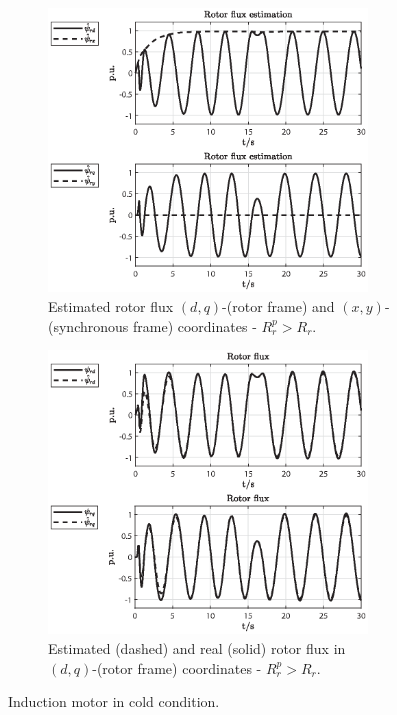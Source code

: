\documentclass[11pt,a4paper,oneside]{book}
\numberwithin{equation}{section}
\theoremstyle{it}
\theoremstyle{definition}
\begin{document}
\begin{figure}[H]
	\centering
	\begin{subfigure}{0.5\textwidth}
	\centering
	\includegraphics[width = 240pt, keepaspectratio]{figures/sim_results/cold_condition/rotor_flux_est_1.eps}
	\captionsetup{width=0.65\textwidth, font=footnotesize}	
	\caption{Estimated rotor flux $(d,q)$-(rotor frame) and $(x,y)$-(synchronous frame) coordinates - $R_r^p > R_r$.}
	\label{fig_sim_res_19}
	\end{subfigure}%
	\begin{subfigure}{0.5\textwidth}
	\centering
	\includegraphics[width = 240pt, keepaspectratio]{figures/sim_results/cold_condition/rotor_flux_est_2.eps}
	\captionsetup{width=0.65\textwidth, font=footnotesize}	
	\caption{Estimated (dashed) and real (solid) rotor flux in $(d,q)$-(rotor frame) coordinates - $R_r^p > R_r$.}
	\label{fig_sim_res_20}
	\end{subfigure}		
	\captionsetup{width=0.5\textwidth, font=small}		
	\caption{Induction motor in cold condition.}
	\label{}
\end{figure}
\end{document}
